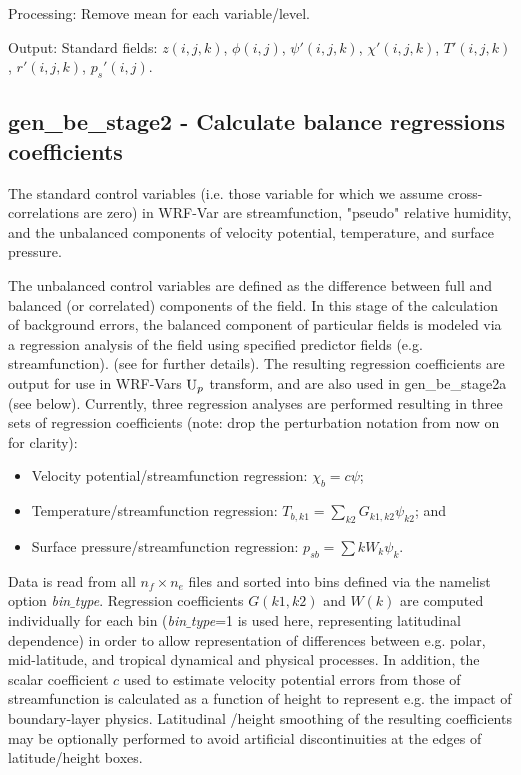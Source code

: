 Processing: Remove mean for each variable/level.

Output: Standard fields: $z(i,j,k)$, $\phi(i,j)$, $\psi'(i,j,k)$, $\chi'(i,j,k)$, 
$T'(i,j,k)$, $r'(i,j,k)$, $p_s'(i,j)$.

\subsection{gen\_be\_stage2 - Calculate balance regressions coefficients}

The standard control variables (i.e. those variable for which we assume cross-correlations are zero) in WRF-Var are streamfunction, "pseudo" relative humidity, and the unbalanced components of velocity potential, temperature, and surface pressure.

The unbalanced control variables are defined as the difference between full and balanced (or correlated) components of the field. In this stage of the calculation of background errors, the balanced component of particular fields is modeled via a regression analysis of the field using specified predictor fields (e.g. streamfunction). (see \citet{wu02} for further details). The resulting regression coefficients are output for use in WRF-Vars ${\rm U}_p$ transform, and are also used in gen\_be\_stage2a (see below). Currently, three regression analyses are performed resulting in three sets of regression coefficients (note: drop the perturbation notation from now on for clarity):


\begin{itemize}\setlength{\parskip}{-4pt}
\item   Velocity potential/streamfunction regression: $\chi_b=c\psi$;
\item	Temperature/streamfunction regression: $T_{b,k1}=\sum_{k2}G_{k1,k2}\psi_{k2}$; and
\item	Surface pressure/streamfunction regression: $p_{sb}=\sum{k}W_{k}\psi_{k}$.
\end{itemize}

Data is read from all $n_f \times n_e$ files and sorted into bins defined via the namelist option {\it bin$\_$type}. Regression coefficients $G(k1,k2)$ and $W(k)$ are computed individually for each bin ({\it bin$\_$type}=1 is used here, representing latitudinal dependence) in order to allow representation of differences between e.g. polar, mid-latitude, and tropical dynamical and physical processes. In addition, the scalar coefficient $c$ used to estimate velocity potential errors from those of streamfunction is calculated as a function of height to represent e.g. the impact of boundary-layer physics. Latitudinal /height smoothing of the resulting coefficients may be optionally performed to avoid artificial discontinuities at the edges of latitude/height boxes.

